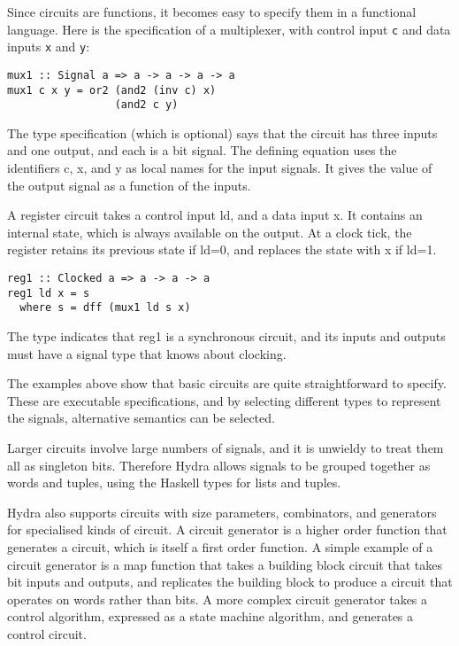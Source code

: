 \documentclass[submission,copyright,creativecommons]{eptcs}
\begin{document}
Since circuits are functions, it becomes easy to specify them in a
functional language.  Here is the specification of a multiplexer, with
control input \texttt{c} and data inputs \texttt{x} and \texttt{y}:

\begin{verbatim}
mux1 :: Signal a => a -> a -> a -> a
mux1 c x y = or2 (and2 (inv c) x)
                 (and2 c y)
\end{verbatim}

The type specification (which is optional) says that the circuit has
three inputs and one output, and each is a bit signal.  The defining
equation uses the identifiers c, x, and y as local names for the input
signals.  It gives the value of the output signal as a function of the
inputs.

A register circuit takes a control input ld, and a data input x.  It
contains an internal state, which is always available on the output.
At a clock tick, the register retains its previous state if ld=0, and
replaces the state with x if ld=1.

\begin{verbatim}
reg1 :: Clocked a => a -> a -> a
reg1 ld x = s
  where s = dff (mux1 ld s x)
\end{verbatim}

The type indicates that reg1 is a synchronous circuit, and its inputs
and outputs must have a signal type that knows about clocking.

The examples above show that basic circuits are quite straightforward
to specify.  These are executable specifications, and by selecting
different types to represent the signals, alternative semantics can be
selected.

Larger circuits involve large numbers of signals, and it is unwieldy
to treat them all as singleton bits.  Therefore Hydra allows signals
to be grouped together as words and tuples, using the Haskell types
for lists and tuples.

Hydra also supports circuits with size parameters, combinators, and
generators for specialised kinds of circuit.  A circuit generator is a
higher order function that generates a circuit, which is itself a
first order function.  A simple example of a circuit generator is a
map function that takes a building block circuit that takes bit inputs
and outputs, and replicates the building block to produce a circuit
that operates on words rather than bits.  A more complex circuit
generator takes a control algorithm, expressed as a state machine
algorithm, and generates a control circuit.
\end{document}
